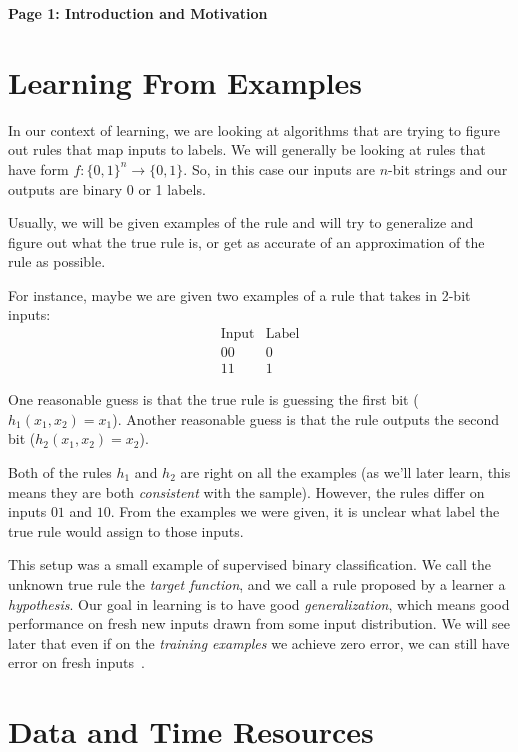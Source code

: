 \documentclass[11pt,fleqn]{article}
\begin{document}
\raggedright
\setlength{\parskip}{0.6em}

{\LARGE\bfseries Page 1: Introduction and Motivation\par}
\medskip

\section{Learning From Examples}

In our context of learning, we are looking at algorithms that are trying to figure out rules that map inputs to labels. We will generally be looking at rules that have form $f: \{0,1\}^n \to \{0, 1\}$. So, in this case our inputs are $n$-bit strings and our outputs are binary 0 or 1 labels.

Usually, we will be given examples of the rule and will try to generalize and figure out what the true rule is, or get as accurate of an approximation of the rule as possible.

For instance, maybe we are given two examples of a rule that takes in 2-bit inputs:
\[
\begin{array}{c|c}
\text{Input} & \text{Label} \\
\hline
00 & 0 \\
11 & 1
\end{array}
\]

One reasonable guess is that the true rule is guessing the first bit ($h_1(x_1, x_2) = x_1$). Another reasonable guess is that the rule outputs the second bit ($h_2(x_1, x_2) = x_2$).

Both of the rules $h_1$ and $h_2$ are right on all the examples (as we'll later learn, this means they are both \textit{consistent} with the sample). However, the rules differ on inputs $01$ and $10$. From the examples we were given, it is unclear what label the true rule would assign to those inputs.

This setup was a small example of supervised binary classification. We call the unknown true rule the \textit{target function}, and we call a rule proposed by a learner a \textit{hypothesis}. Our goal in learning is to have good \textit{generalization}, which means good performance on fresh new inputs drawn from some input distribution. We will see later that even if on the \textit{training examples} we achieve zero error, we can still have error on fresh inputs~\cite{kearns,mit-ml}.

\section{Data and Time Resources}
\end{document}
